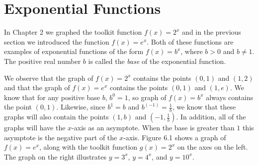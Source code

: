 \documentclass[10pt,]{book}
\theoremstyle{ptxdefinitionnotitle}
\theoremstyle{ptxdefinitiontitle}
\theoremstyle{ptxdefinitionnotitle}
\theoremstyle{ptxdefinitiontitle}
\theoremstyle{ptxdefinitionnotitle}
\theoremstyle{ptxdefinitiontitle}
\numberwithin{equation}{section}
\newcommand{\gt}{>}
\begin{document}
\section[{Exponential Functions}]{Exponential Functions}\label{chapter04-section06}
\hypertarget{p-232}{}%
In Chapter 2 we graphed the toolkit function \(f(x)=2^x\) and in the previous section we introduced the function  \(f(x)=e^x\).  Both of these functions are examples of exponential functions of the form  \(f(x)=b^x\), where  \(b \gt 0\) and \(b \neq 1\).  The positive real number \(b\) is called the \emph{base} of the exponential function.%
\par
\hypertarget{p-233}{}%
We observe that the graph of \(f(x)=2^x\)  contains the points \((0,1)\) and \((1,2)\) and that the graph of \(f(x)=e^x\) contains the points \((0,1)\) and \((1,e)\).  We know that for any positive base \(b\), \(b^0=1\), so graph of \(f(x)=b^x\) always contains the point \((0,1)\). Likewise, since \(b^1=b\) and \(b^(-1)=\frac{1}{b}\), we know that these graphs will also contain the points \((1,b)\) and \((-1,\frac{1}{b})\). In addition, all of the graphs will have the \(x\)-axis as an asymptote.  When the base is greater than \(1\) this asymptote is the negative part of the \(x\)-axis. Figure 6.1 shows a graph of \(f(x)=e^x\), along with the toolkit function \(g(x)=2^x\) on the axes on the left. The graph on the right illustrates \(y=3^x\), \(y=4^x\), and \(y=10^x\).%
\end{document}
